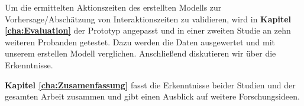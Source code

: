 Um die ermittelten Aktionszeiten des erstellten Modells zur Vorhersage/Abschätzung von Interaktionszeiten zu validieren, wird in \textbf{Kapitel \ref{cha:Evaluation}} der Prototyp angepasst und in einer zweiten Studie an zehn weiteren Probanden getestet.
Dazu werden die Daten ausgewertet und mit unserem erstellen Modell verglichen.
Anschließend diskutieren wir über die Erkenntnisse.

\textbf{Kapitel \ref{cha:Zusamenfassung}} fasst die Erkenntnisse beider Studien und der gesamten Arbeit zusammen und gibt einen Ausblick auf weitere Forschungsideen.
